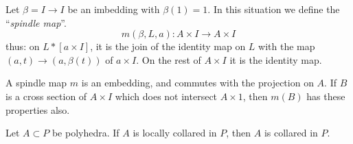 Let $\beta=I\to I$ be an imbedding with $\beta(1)=1$. In this situation we define the ``{\em spindle map}''.
$$
m(\beta,L,a):A\times I\to A\times I
$$
thus: on $L\ast[a\times I]$, it is the join of the identity map on $L$ with the map $(a,t)\to (a,\beta(t))$ of $a\times I$. On the rest of $A\times I$ it is the identity map.

A spindle map $m$ is an embedding, and commutes with the projection on $A$. If $B$ is a cross section of $A\times I$ which does not intersect $A\times 1$, then $m(B)$ has these properties also.

\setcounter{proposition}{16}
\begin{proposition}\label{chap6-prop6.4.15}
Let $A\subset P$ be polyhedra. If $A$ is locally collared in $P$, then $A$ is collared in $P$.
\end{proposition}

